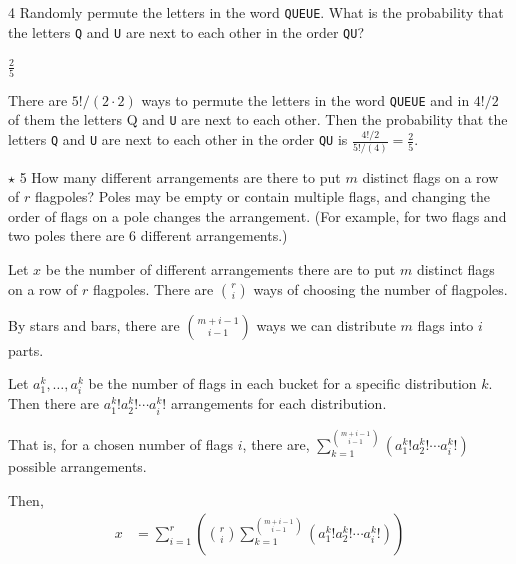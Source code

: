 \documentclass[12pt]{article}
\begin{document}
\begin{problem}{4}
    Randomly permute the letters in the word \texttt{QUEUE}.
    What is the probability that the letters \texttt{Q} and \texttt{U} are next to each other in the order \texttt{QU}?
\end{problem}

\begin{solution}
    \bbni $\frac{2}{5}$
    
    There are $5!/(2 \cdot 2)$ ways to permute the letters in the word \texttt{QUEUE} and in $4!/2$ of them the letters {Q} and \texttt{U} are next to each other. Then the probability that the letters \texttt{Q} and \texttt{U} are next to each other in the order \texttt{QU} is $\frac{4!/2}{5!/(4)} = \frac{2}{5}$. 

\end{solution}

\bbni 

\begin{problem}{$\star$ 5}
How many different arrangements are there to put $m$ distinct flags on a row of $r$ flagpoles?
Poles may be empty or contain multiple flags, and changing the order of flags on a pole changes the arrangement.
(For example, for two flags and two poles there are $6$ different arrangements.)
\end{problem}

\begin{solution}
    \bbni

    Let $x$ be the number of different arrangements there are to put $m$ distinct flags on a row of $r$ flagpoles. 
    There are $\binom{r}{i}$ ways of choosing the number of flagpoles. 
    
    By stars and bars, there are $\binom{m+i-1}{i-1}$  ways we can distribute $m$ flags into $i$ parts. 

    Let $a^k_1, \ldots, a^k_i$ be the number of flags in each bucket for a specific distribution $k$. Then there are $a^k_1! a^k_2! \cdots a^k_i!$ arrangements for each distribution. 

    That is, for a chosen number of flags $i$, there are, 
    $\sum_{k=1}^{\binom{m+i-1}{i-1}} (a^k_1! a^k_2! \cdots a^k_i!)$ possible arrangements. 

    Then,
    \begin{align*}
       x &= \sum_{i=1}^{r} \left( \binom{r}{i} \sum_{k=1}^{\binom{m+i-1}{i-1}} (a^k_1! a^k_2! \cdots a^k_i!) \right)
    \end{align*}
\end{solution}
\end{document}
